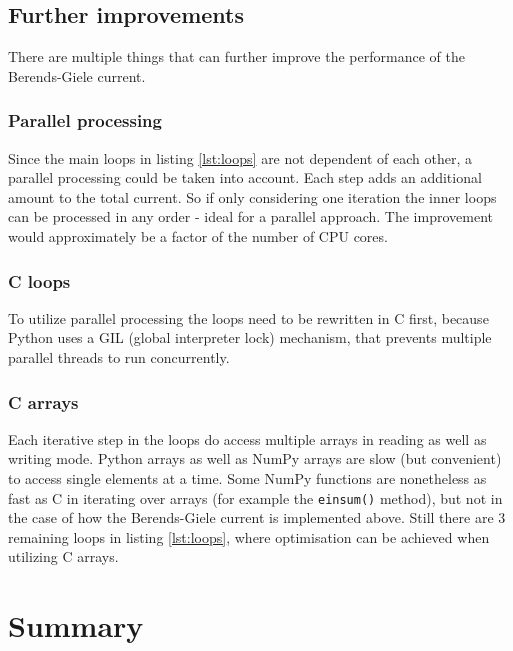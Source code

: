 \documentclass{article}
\theoremstyle{definition}
\def\code#1{\texttt{#1}}
\numberwithin{equation}{section}
\begin{document}
\subsection{Further improvements}
\label{sec:improvements}

There are multiple things that can further improve the performance of the Berends-Giele current.

\subsubsection{Parallel processing}
\label{sec:parallel}

Since the main loops in listing \ref{lst:loops} are not dependent of each other, a parallel processing could be taken into account. Each step adds an additional amount to the total current. So if only considering one iteration the inner loops can be processed in any order - ideal for a parallel approach. The improvement would approximately be a factor of the number of CPU cores.

\subsubsection{C loops}
To utilize parallel processing the loops need to be rewritten in C first, because Python uses a GIL (global interpreter lock) mechanism, that prevents multiple parallel threads to run concurrently.

\subsubsection{C arrays}
Each iterative step in the loops do access multiple arrays in reading as well as writing mode. Python arrays as well as NumPy arrays are slow (but convenient) to access single elements at a time. Some NumPy functions are nonetheless as fast as C in iterating over arrays (for example the \code{einsum()} method), but not in the case of how the Berends-Giele current is implemented above. Still there are 3 remaining loops in listing \ref{lst:loops}, where optimisation can be achieved when utilizing C arrays.

\section{Summary}
\end{document}
